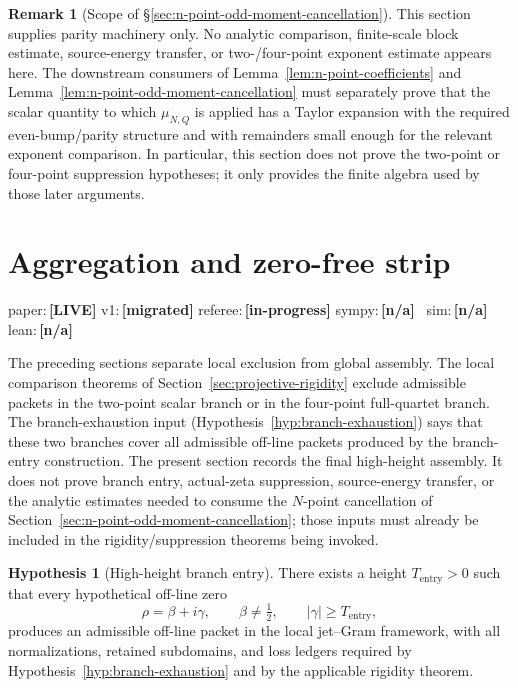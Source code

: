 \documentclass[11pt,a4paper]{amsart}
\numberwithin{equation}{section}
\theoremstyle{plain}
\theoremstyle{definition}
\newtheorem{remark}[theorem]{Remark}
\newtheorem{hypothesis}[theorem]{Hypothesis}
\newcommand{\status}[1]{\textbf{\scriptsize[#1]}}
\newcommand{\statuspaper}[1]{\textsf{\footnotesize paper:}\,\status{#1}}
\newcommand{\statusmig}[1]{\textsf{\footnotesize v1:}\,\status{#1}}
\newcommand{\statusreferee}[1]{\textsf{\footnotesize referee:}\,\status{#1}}
\newcommand{\statussympy}[2][\relax]{%
  \textsf{\footnotesize sympy:}\,\status{#2}%
  \ifx\relax#1\else\,\textsf{\scriptsize\texttt{#1}}\fi%
}
\newcommand{\statussim}[2][\relax]{%
  \textsf{\footnotesize sim:}\,\status{#2}%
  \ifx\relax#1\else\,\textsf{\scriptsize\texttt{#1}}\fi%
}
\newcommand{\statuslean}[2][\relax]{%
  \textsf{\footnotesize lean:}\,\status{#2}%
  \ifx\relax#1\else\,\textsf{\scriptsize\texttt{#1}}\fi%
}
\begin{document}
\begin{remark}[Scope of \S\ref{sec:n-point-odd-moment-cancellation}]
\label{rem:n-point-scope}
This section supplies parity machinery only.  No analytic comparison,
finite-scale block estimate, source-energy transfer, or two-/four-point
exponent estimate appears here.  The downstream consumers of
Lemma~\ref{lem:n-point-coefficients} and
Lemma~\ref{lem:n-point-odd-moment-cancellation} must separately prove
that the scalar quantity to which \(\mu_{N,Q}\) is applied has a Taylor
expansion with the required even-bump/parity structure and with
remainders small enough for the relevant exponent comparison.  In
particular, this section does not prove the two-point or four-point
suppression hypotheses; it only provides the finite algebra used by those
later arguments.
\end{remark}

\section{Aggregation and zero-free strip}
\label{sec:aggregation-and-zero-free-strip}
\statuspaper{LIVE}\quad
\statusmig{migrated}\quad
\statusreferee{in-progress}\quad
\statussympy{n/a}\quad
\statussim{n/a}\quad
\statuslean{n/a}
\par\medskip

The preceding sections separate local exclusion from global assembly.  The
local comparison theorems of Section~\ref{sec:projective-rigidity} exclude
admissible packets in the two-point scalar branch or in the four-point
full-quartet branch.  The branch-exhaustion input
(Hypothesis~\ref{hyp:branch-exhaustion}) says that these two branches cover
all admissible off-line packets produced by the branch-entry construction.
The present section records the final high-height assembly.  It does not
prove branch entry, actual-zeta suppression, source-energy transfer, or the
analytic estimates needed to consume the \(N\)-point cancellation of
Section~\ref{sec:n-point-odd-moment-cancellation}; those inputs must already
be included in the rigidity/suppression theorems being invoked.

\begin{hypothesis}[High-height branch entry]
\label{hyp:high-height-branch-entry}
There exists a height \(T_{\mathrm{entry}}>0\) such that every hypothetical
off-line zero
\[
        \rho=\beta+i\gamma,
        \qquad \beta\ne \tfrac12,
        \qquad |\gamma|\ge T_{\mathrm{entry}},
\]
produces an admissible off-line packet in the local jet--Gram framework, with
all normalizations, retained subdomains, and loss ledgers required by
Hypothesis~\ref{hyp:branch-exhaustion} and by the applicable rigidity theorem.
\end{hypothesis}
\end{document}
